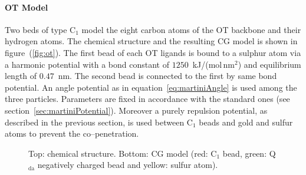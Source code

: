 \paragraph{\textbf{OT Model}} Two \martini beds of type C$_1$ model the eight carbon atoms of the \ac{OT} backbone and their hydrogen atoms. The chemical structure and the resulting \ac{CG} \martini model is shown in figure~(\ref{fig:ot}). The first bead of each \ac{OT} ligands is bound to a sulphur atom via a harmonic potential with a bond constant of $1250$~kJ/(mol\,nm$^2$) and equilibrium length of $0.47$~nm. The second bead is connected to the first by same bond potential. An angle potential as in equation~\eqref{eq:martiniAngle} is used among the three particles. Parameters are fixed in accordance with the standard \martini ones (see section~\ref{sec:martiniPotential}). Moreover a purely repulsion potential, as described in the previous section, is used between C$_1$ beads and gold and sulfur atoms to prevent the co--penetration.
\begin{figure}[!ht]
	\centering
	\qquad\qquad%
	\caption{Top: chemical structure. Bottom: \acs{CG} \martini model (red: C$_1$ bead, green: Q$_\text{da}$ negatively charged bead and yellow: sulfur atom).}
\end{figure}

